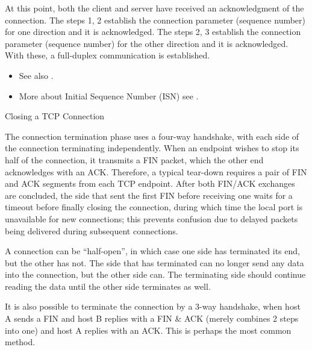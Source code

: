 At this point, both the client and server have received an acknowledgment of the
connection. The steps 1, 2 establish the connection parameter (sequence number) for one
direction and it is acknowledged. The steps 2, 3 establish the connection parameter
(sequence number) for the other direction and it is acknowledged. With these, a
full-duplex communication is established.

\begin{itemize}
\item See also .
\item More about Initial Sequence Number (ISN) see
  .
\end{itemize}

\begin{frame}{Closing a TCP Connection}
  \begin{center}
  \end{center}
  \label{fig:3way-close}
\end{frame}

The connection termination phase uses a four-way handshake, with each side of the
connection terminating independently. When an endpoint wishes to stop its half of the
connection, it transmits a FIN packet, which the other end acknowledges with an
ACK. Therefore, a typical tear-down requires a pair of FIN and ACK segments from each TCP
endpoint. After both FIN/ACK exchanges are concluded, the side that sent the first FIN
before receiving one waits for a timeout before finally closing the connection, during
which time the local port is unavailable for new connections; this prevents confusion due
to delayed packets being delivered during subsequent connections. 

A connection can be ``half-open'', in which case one side has terminated its end, but the
other has not. The side that has terminated can no longer send any data into the
connection, but the other side can. The terminating side should continue reading the data
until the other side terminates as well.

It is also possible to terminate the connection by a 3-way handshake, when host A sends a
FIN and host B replies with a FIN \& ACK (merely combines 2 steps into one) and host A
replies with an ACK. This is perhaps the most common method.

